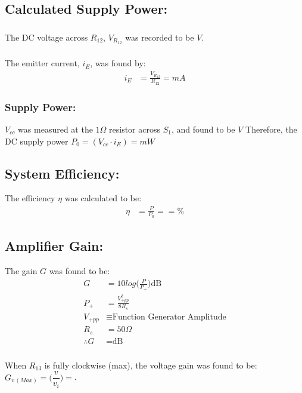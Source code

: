 \subsection{Calculated Supply Power: }
\subsubsection{} 
  The DC voltage across $R_{12}$, $V_{R_{12}}$ was recorded to be $\boxed{ V}$.
  \subsubsection{}
  The emitter current, $i_E$, was found by:
  \begin{align*}
    i_E &= \frac{V_{R_{12}}}{R_{12}}=\boxed{ mA}
  \end{align*}
  \subsubsection{Supply Power: }
    $V_{cc}$ was measured at the $1\Omega$ resistor across $S_1$, and found to
    be $\boxed{ V}$ Therefore, the DC supply power $P_0 = (V_{cc}\cdot i_E)=\boxed{ mW}$

\subsection{System Efficiency: \bm{$\eta$}}
  The efficiency $\eta$ was calculated to be:
  \begin{align*}
    \eta &= \frac{P}{P_0} = \boxed{ } = \boxed{ \%} 
  \end{align*}

\subsection{Amplifier Gain: }
  The gain $G$ was found to be:
  \begin{align*}
    G &= 10log\bigg(\frac{P}{P_{+}}\bigg) \text{dB}\\
    P_{+} &=  \frac{V_{+pp}^2}{8R_s}\\
    V_{+pp} &\equiv \text{Function Generator Amplitude}\\
    R_s &= 50\Omega\\
    \therefore G &= \boxed{ \text{dB}}
  \end{align*}
\subsubsection{}
When $R_{13}$ is fully clockwise (max), the voltage gain was found to be:
$G_{v\,(Max)} = \bigg(\dfrac{v}{v_i}\bigg) = \boxed{}$.

